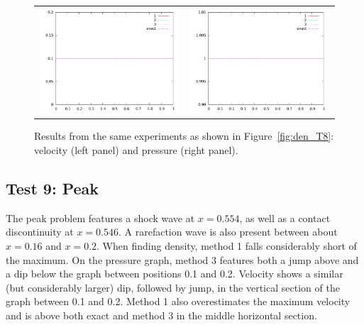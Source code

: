 \documentclass[10pt]{article}
\begin{document}
\begin{figure}
  \begin{center}
	\begin{tabular}{cc}
      \includegraphics[width=.475\textwidth]{vel_T8.png} &
	  \includegraphics[width=.475\textwidth]{prs_T8.png}
	\end{tabular}
  \end{center}
  \caption{Results from the same experiments as shown in Figure~\ref{fig:den_T8}:
  velocity (left panel) and pressure (right panel).}
\end{figure}

\clearpage

\subsection{Test 9: Peak}
The peak problem features a shock wave at $x=0.554$, as well as a contact discontinuity at $x=0.546$. A rarefaction wave is also present between about $x=0.16$ and $x=0.2$. When finding density, method 1 falls considerably short of the maximum. On the pressure graph, method 3 features both a jump above and a dip below the graph between positions 0.1 and 0.2. Velocity shows a similar (but considerably larger) dip, followed by jump, in the vertical section of the graph between 0.1 and 0.2. Method 1 also overestimates the maximum velocity and is above both exact and method 3 in the middle horizontal section. 
\end{document}
